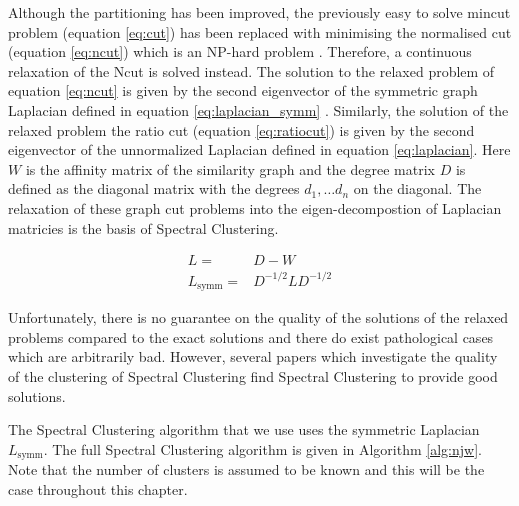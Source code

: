 Although the partitioning has been improved, the previously easy to solve mincut problem (equation \ref{eq:cut}) has been replaced with minimising the normalised cut (equation \ref{eq:ncut}) which is an NP-hard problem \citep{Wagner1993}. Therefore,  a continuous relaxation of the Ncut is solved instead. The solution to the relaxed problem of equation \eqref{eq:ncut} is given by the second eigenvector of the symmetric graph Laplacian defined in equation \eqref{eq:laplacian_symm} \citep{Luxburg2008}. Similarly, the solution of the relaxed problem the ratio cut (equation \ref{eq:ratiocut}) is given by the second eigenvector of the unnormalized Laplacian defined in equation \eqref{eq:laplacian}. Here $W$ is the affinity matrix of the similarity graph and the degree matrix $D$ is defined as the diagonal matrix with the degrees $d_1, \ldots d_n$ on the diagonal. The relaxation of these graph cut problems into the eigen-decompostion of Laplacian matricies is the basis of Spectral Clustering. 

\begin{eqnarray}
\label{eq:laplacian}
 L =& D - W\\
\label{eq:laplacian_symm}
 L_{\text{symm}} =& D^{-1/2}LD^{-1/2} 
\end{eqnarray}


Unfortunately, there is no guarantee on the quality of the solutions of the relaxed problems compared to the exact solutions \citep{chung1997spectral} and there do exist pathological cases which are arbitrarily bad. However, several papers which investigate the quality of the clustering of Spectral Clustering \citep{Spielman1996, Kannan2004} find Spectral Clustering to provide good solutions. 

The Spectral Clustering algorithm that we use \citep{Ng2001} uses the symmetric Laplacian  $L_{\text{symm}}$. The full Spectral Clustering algorithm is given in Algorithm \ref{alg:njw}. Note that the number of clusters is assumed to be known and this will be the case throughout this chapter.


